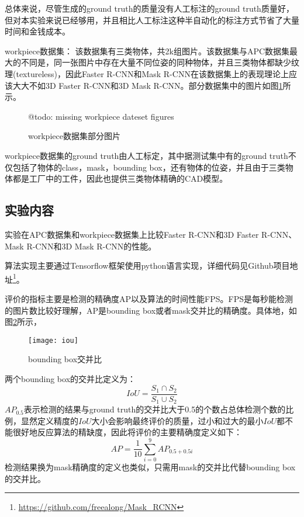 总体来说，尽管生成的ground truth的质量没有人工标注的ground truth质量好，但对本实验来说已经够用，并且相比人工标注这种半自动化的标注方式节省了大量时间和金钱成本。

{\kai workpiece数据集：} 该数据集有三类物体，共2k组图片。该数据集与APC数据集最大的不同是，同一张图片中存在大量不同位姿的同种物体，并且三类物体都缺少纹理(textureless)，因此Faster R-CNN和Mask R-CNN在该数据集上的表现理论上应该大大不如3D Faster R-CNN和3D Mask R-CNN。部分数据集中的图片如图\ref{fig:wp_dataset}所示。
\begin{figure}[ht]
  \centering
  @todo: missing workpiece dateset figures
  \hskip0.2cm
  \vfill
  \hskip0.2cm
  \caption{workpiece数据集部分图片}
  \label{fig:wp_dataset}
\end{figure}
workpiece数据集的ground truth由人工标定，其中据测试集中有的ground truth不仅包括了物体的class，mask，bounding box，还有物体的位姿，并且由于三类物体都是工厂中的工件，因此也提供三类物体精确的CAD模型。

\subsection{实验内容}
实验在APC数据集和workpiece数据集上比较Faster R-CNN和3D Faster R-CNN、Mask R-CNN和3D Mask R-CNN的性能。

{\kai 算法实现}主要通过Tensorflow框架使用python语言实现，详细代码见Github项目地址\footnote{\url{https://github.com/freealong/Mask\_RCNN}}。

{\kai 评价的指标}主要是检测的精确度AP以及算法的时间性能FPS。FPS是每秒能检测的图片数比较好理解，AP是bounding box或者mask交并比的精确度。具体地，如图\ref{fig:iou}所示，
\begin{figure}[ht]
  \centering
  \texttt{[image: iou]}
  \caption{bounding box交并比}
  \label{fig:iou}
\end{figure}
两个bounding box的交并比定义为：
\begin{equation}
  IoU = \frac{S_1\cap S_2}{S_1\cup S_2}
\end{equation}
$AP_{0.5}$表示检测的结果与ground truth的交并比大于0.5的个数占总体检测个数的比例，显然定义精度的$IoU$大小会影响最终评价的质量，过小和过大的最小$IoU$都不能很好地反应算法的精缺度，因此将评价的主要精确度定义如下：
\begin{equation}
  AP = \frac{1}{10}\sum_{i=0}^{9}{AP_{0.5 + 0.5i}}
\end{equation}
检测结果换为mask精确度的定义也类似，只需用mask的交并比代替bounding box的交并比。


